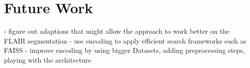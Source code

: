 
\chapter{Future Work}\label{chapter:future_work}

- figure out adaptions that might allow the approach to work better on the FLAIR segmentation \newline
- use encoding to apply efficient search frameworks such as FAISS \newline
- improve encoding by using bigger Datasets, adding preprocessing steps, playing with the architecture \newline
